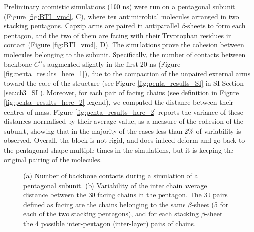 Preliminary atomistic simulations (100 ns) were run on a pentagonal subunit (Figure \ref{fig:BTI_vmd}, C), where ten antimicrobial molecules arranged in two stacking pentagons. Capzip arms are paired in antiparallel $\beta$-sheets to form each pentagon, and the two of them are facing with their Tryptophan residues in contact (Figure \ref{fig:BTI_vmd}, D).
%
The simulations prove the cohesion between molecules belonging to the subunit. Specifically, the number of contacts between backbone $C^\alpha$s augmented slightly in the first 20 ns (Figure \ref{fig:penta_results_here_1}), due to the compaction of the unpaired external arms toward the core of the structure (see Figure \ref{fig:penta_results_SI} in SI Section \ref{sec:ch3_SI}).
%
Moreover, for each pair of facing chains (see definition in Figure \ref{fig:penta_results_here_2} legend), we computed the distance between their centres of mass. Figure \ref{fig:penta_results_here_2} reports the variance of these distances normalised by their average value, as a measure of the cohesion of the subunit, showing that in the majority of the cases less than 2\% of variability is observed. Overall, the block is not rigid, and does indeed deform and go back to the pentagonal shape multiple times in the simulations, but it is keeping the original pairing of the molecules.
\begin{figure}[t!]
\centering
{}
\caption[Cohesion measures on the pentagonal subunit]{(a) Number of backbone contacts during a simulation of a pentagonal subunit. (b) Variability of the inter chain average distance between the 30 facing chains in the pentagon. The 30 pairs defined as facing are the chains belonging to the same $\beta$-sheet (5 for each of the two stacking pentagons), and for each stacking $\beta$-sheet the 4 possible inter-pentagon (inter-layer) pairs of chains.}
\label{fig:penta_results_here}
\end{figure}

